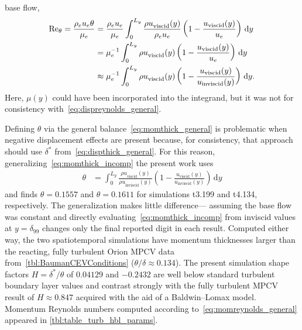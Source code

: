 base flow,
\begin{align}
    \Reynolds[\theta]{}
=   \frac{\rho_e u_e \theta}{\mu_e}
&=  \frac{\rho_e u_e       }{\mu_e}
    \int_0^{L_y} \frac{{\rho u}_\text{viscid} (y)}{\rho_e u_e} \left(
        1 - \frac{{u}_\text{viscid} (y)}{u_e}
    \right)  \, \mathrm{d}y
\notag\\
&=  \mu_e^{-1}
    \int_0^{L_y} {\rho u}_\text{viscid} (y) \left(
        1 - \frac{{u}_\text{viscid} (y)}{u_e}
    \right)  \, \mathrm{d}y
\notag\\
&\approx  \mu_e^{-1}
    \int_0^{L_y} {\rho u}_\text{viscid} (y) \left(
        1 - \frac{{u}_\text{viscid} (y)}{u_\text{inviscid} (y)}
    \right)  \, \mathrm{d}y.
    \label{eq:momreynolds_general}
\end{align}
Here, $\mu(y)$ could have been incorporated into the integrand, but it
was not for consistency with~\eqref{eq:dispreynolds_general}.

Defining $\theta$ via the general balance~\eqref{eq:momthick_general} is
problematic when negative displacement effects are present because, for
consistency, that approach should use $\delta^\ast$ from~\eqref{eq:dispthick_general}.
%
For this reason, generalizing~\eqref{eq:momthick_incomp} the present work uses
\begin{align}
    \theta
&=
    \int_0^{L_y} \frac{{\rho u}_\text{viscid} (y)}
                      {{\rho u}_\text{inviscid}(y)} \left(
        1 - \frac{{u}_\text{viscid} (y)}{u_\text{inviscid}(y)}
    \right)  \, \mathrm{d}y
\end{align}
and finds $\theta=0.1557$ and $\theta=0.1611$ for simulations t3.199 and t4.134,
respectively.  The generalization makes little difference--- assuming the base
flow was constant and directly evaluating~\eqref{eq:momthick_incomp} from
inviscid values at $y=\delta_{99}$ changes only the final reported digit in each
result.
%
Computed either way, the two spatiotemporal simulations have momentum
thicknesses larger than the reacting, fully turbulent Orion MPCV data
from~\autoref{tbl:BaumanCEVConditions} ($\theta/\delta\approx 0.134$).
%
The present simulation shape factors $H=\delta^\ast/\theta$ of $0.04129$ and
$-0.2432$ are well below standard turbulent boundary layer values and contrast
strongly with the fully turbulent MPCV result of $H\approx0.847$ acquired with
the aid of a Baldwin--Lomax model.
%
Momentum Reynolds numbers computed according
to~\eqref{eq:momreynolds_general} appeared in
\autoref{tbl:table_turb_hbl_params}.




